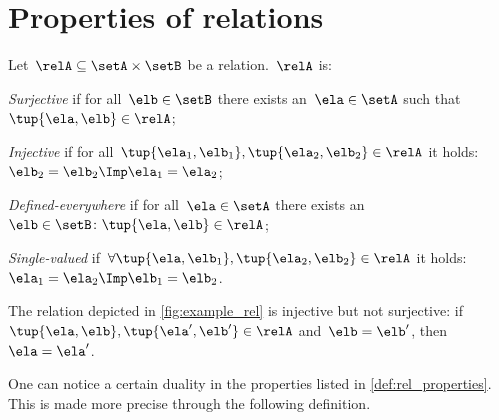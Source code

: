 

\section{Properties of relations}


\begin{definition}
  \label{def:rel_properties}
  Let~$\relA\subseteq \setA \times \setB$ be a relation.~$\relA$ is:
  \begin{compactenum}
    \item \emph{Surjective} if for all~$\elb\in \setB$ there exists an~$\ela\in \setA$ such that~$\tup{\ela,\elb}\in \relA$;
    \item \emph{Injective} if for all~$ \tup{\ela_1,\elb_1},\tup{\ela_2,\elb_2}\in \relA$ it holds:~$\elb_2=\elb_2 \Imp \ela_1=\ela_2$;
    \item \emph{Defined-everywhere} if for all~$\ela\in \setA$ there exists an ~$\elb \in \setB\colon \tup{\ela,\elb}\in \relA$;
    \item \emph{Single-valued} if~$\forall \tup{\ela,\elb_1},\tup{\ela_2,\elb_2}\in \relA$ it holds:~$\ela_1=\ela_2\Imp \elb_1=\elb_2$.
  \end{compactenum}
\end{definition}

\begin{example}
  The relation depicted in \cref{fig:example_rel} is injective but not surjective: if~$\tup{\ela,\elb},\tup{\ela',\elb'}\in \relA$ and~$\elb=\elb'$, then~$\ela=\ela'$.
\end{example}

One can notice a certain duality in the properties listed in \cref{def:rel_properties}. This is made more precise through the following definition.

